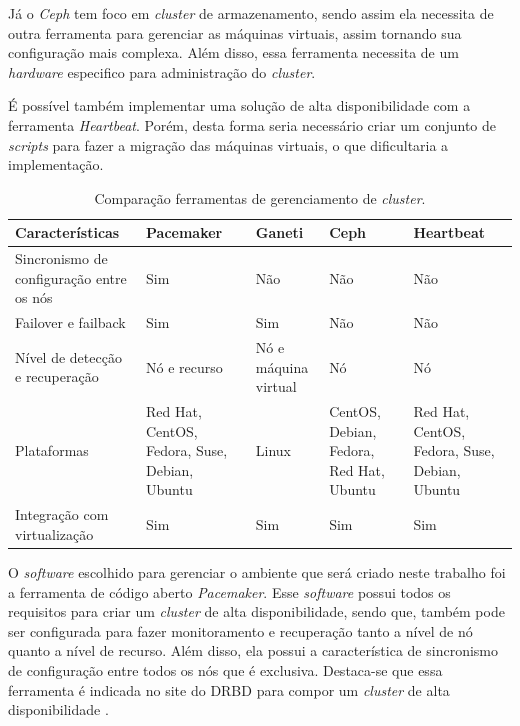 Já o \textit{Ceph} tem foco em \textit{cluster} de armazenamento, sendo assim ela necessita de outra ferramenta para gerenciar as máquinas 
virtuais, assim tornando sua configuração mais complexa. Além disso, essa ferramenta necessita de um \textit{hardware} especifico para 
administração do \textit{cluster}.

É possível também implementar uma solução de alta disponibilidade com a ferramenta \textit{Heartbeat}. Porém, desta forma seria necessário criar 
um conjunto de \textit{scripts} para fazer a migração das máquinas virtuais, o que dificultaria a implementação.

\begin{table}[h!]
\caption{Comparação ferramentas de gerenciamento de \textit{cluster}.}
\label{tab:clusterger}
\begin{center}
\begin{tabular}{|p{3.5cm}|p{2.7cm}|p{2cm}|p{2.7cm}|p{2.7cm}|}\hline
\textbf{Características} & \textbf{Pacemaker} & \textbf{Ganeti} & \textbf{Ceph} & \textbf{Heartbeat} \\\hline
Sincronismo de configuração entre os nós & Sim & Não & Não & Não \\\hline
Failover e failback & Sim & Sim & Não & Não \\\hline
Nível de detecção e recuperação & Nó e recurso & Nó e máquina virtual & Nó & Nó \\\hline
Plataformas & Red Hat, CentOS, Fedora, Suse, Debian, Ubuntu & Linux & CentOS, Debian, Fedora, Red Hat, Ubuntu & Red Hat, CentOS, Fedora, Suse, Debian, Ubuntu \\\hline
Integração com virtualização & Sim & Sim & Sim & Sim \\\hline
\end{tabular}
\end{center}
\end{table}

O \textit{software} escolhido para gerenciar o ambiente que será criado neste trabalho foi a ferramenta de código aberto \textit{Pacemaker}. 
Esse \textit{software} possui todos os requisitos para criar um \textit{cluster} de alta disponibilidade, sendo que, também pode ser configurada 
para fazer monitoramento e recuperação tanto a nível de nó quanto a nível de recurso. Além disso, ela possui a característica de sincronismo de 
configuração entre todos os nós que é exclusiva. Destaca-se que essa ferramenta é indicada no site do \ac{DRBD} para compor um \textit{cluster} 
de alta disponibilidade \cite{drbd}.

